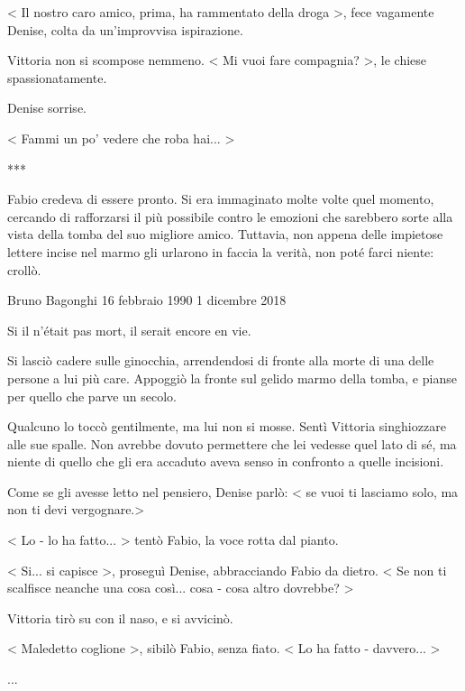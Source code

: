 < Il nostro caro amico, prima, ha rammentato della droga >, fece vagamente Denise, colta da un'improvvisa ispirazione.

Vittoria non si scompose nemmeno. < Mi vuoi fare compagnia? >, le chiese spassionatamente.

Denise sorrise. 

< Fammi un po' vedere che roba hai... >

***

Fabio credeva di essere pronto. Si era immaginato molte volte quel momento, cercando di rafforzarsi il più possibile contro le emozioni che sarebbero sorte alla vista della tomba del suo migliore amico. Tuttavia, non appena delle impietose lettere incise nel marmo gli urlarono in faccia la verità, non poté farci niente: crollò.

Bruno Bagonghi
16 febbraio 1990
1 dicembre 2018

Si il n'était pas mort, il serait encore en vie.

Si lasciò cadere sulle ginocchia, arrendendosi di fronte alla morte di una delle persone a lui più care. Appoggiò la fronte sul gelido marmo della tomba, e pianse per quello che parve un secolo.

Qualcuno lo toccò gentilmente, ma lui non si mosse. Sentì Vittoria singhiozzare alle sue spalle. Non avrebbe dovuto permettere che lei vedesse quel lato di sé, ma niente di quello che gli era accaduto aveva senso in confronto a quelle incisioni.

Come se gli avesse letto nel pensiero, Denise parlò: < se vuoi ti lasciamo solo, ma non ti devi vergognare.>

< Lo - lo ha fatto... > tentò Fabio, la voce rotta dal pianto.

< Si... si capisce >, proseguì Denise, abbracciando Fabio da dietro. < Se non ti scalfisce neanche una cosa così... cosa - cosa altro dovrebbe? >

Vittoria tirò su con il naso, e si avvicinò.

< Maledetto coglione >, sibilò Fabio, senza fiato. < Lo ha fatto - davvero... >

...